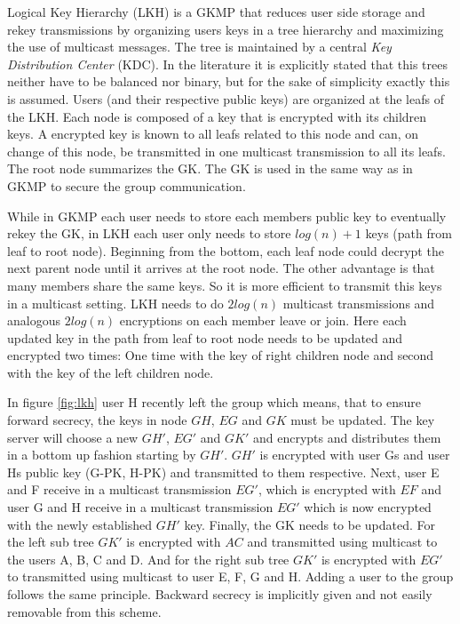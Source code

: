 Logical Key Hierarchy (\ac{LKH})\cite{wallner1999key} is a \ac{GKMP} that reduces user side storage and rekey transmissions by organizing users keys in a tree hierarchy and maximizing the use of multicast messages. The tree is maintained by a central \textit{Key Distribution Center} (\ac{KDC}). In the literature it is explicitly stated that this trees neither have to be balanced nor binary, but for the sake of simplicity exactly this is assumed. Users (and their respective public keys) are organized at the leafs of the LKH. Each node is composed of a key that is encrypted with its children keys. A encrypted key is known to all leafs related to this node and can, on change of this node, be transmitted in one multicast transmission to all its leafs. The root node summarizes the \ac{GK}. The \ac{GK} is used in the same way as in \ac{GKMP} to secure the group communication. 

While in \ac{GKMP} each user needs to store each members public key to eventually rekey the GK, in \ac{LKH} each user only needs to store $log(n) +1$ keys (path from leaf to root node). Beginning from the bottom, each leaf node could decrypt the next parent node until it arrives at the root node. The other advantage is that many members share the same keys. So it is more efficient to transmit this keys in a multicast setting. \ac{LKH} needs to do $2log(n)$ multicast transmissions and analogous $2log(n)$ encryptions on each member leave or join.  Here each updated key in the path from leaf to root node needs to be updated and encrypted two times: One time with the key of right children node and second with the key of the left children node. 

In figure \ref{fig:lkh} user H recently left the group which means, that to ensure forward secrecy, the keys in node $GH$, $EG$ and $GK$ must be updated. The key server will choose a new $GH'$, $EG'$ and $GK'$ and encrypts and distributes them in a bottom up fashion starting by $GH'$. $GH'$ is encrypted with user Gs and user Hs public key (G-PK, H-PK) and transmitted to them respective. Next, user E and F receive in a multicast transmission $EG'$, which is encrypted with $EF$ and user G and H receive in a multicast transmission $EG'$ which is now encrypted with the newly established $GH'$ key. Finally, the GK needs to be updated. For the left sub tree $GK'$ is encrypted with $AC$ and transmitted using multicast to the users A, B, C and D. And for the right sub tree $GK'$ is encrypted with $EG'$ to transmitted using multicast to user E, F, G and H. Adding a user to the group follows the same principle. Backward secrecy is implicitly given and not easily removable from this scheme.

